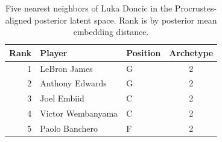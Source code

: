 \begin{table}[htbp]
  \centering\small
  \begin{tabular}{rllc}
    \toprule
    Rank & Player & Position & Archetype \\
    \midrule
    1 & LeBron James & G & 2 \\
    2 & Anthony Edwards & G & 2 \\
    3 & Joel Embiid & C & 2 \\
    4 & Victor Wembanyama & C & 2 \\
    5 & Paolo Banchero & F & 2 \\
    \bottomrule
  \end{tabular}
  \caption{Five nearest neighbors of Luka Doncic in the Procrustes-aligned posterior latent space. Rank is by posterior mean embedding distance.}
  \label{tab:Luka_Doncic_neighbors}
\end{table}

